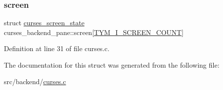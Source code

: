 \subsubsection{\texorpdfstring{screen}{screen}}
{\footnotesize\ttfamily struct \hyperlink{structcurses__screen__state}{curses\+\_\+screen\+\_\+state} curses\+\_\+backend\+\_\+pane\+::screen\mbox{[}\hyperlink{pane_8h_a49f1d9b192f4f01ff444123abde24761a4675b455ce9ebdc1c317e91e0c66e5e0}{T\+Y\+M\+\_\+\+I\+\_\+\+S\+C\+R\+E\+E\+N\+\_\+\+C\+O\+U\+NT}\mbox{]}}



Definition at line 31 of file curses.\+c.



The documentation for this struct was generated from the following file\+:\begin{DoxyCompactItemize}
\item 
src/backend/\hyperlink{curses_8c}{curses.\+c}\end{DoxyCompactItemize}
